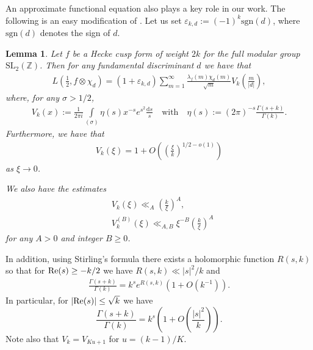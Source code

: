 \documentclass[a4paper,10pt,twoside]{amsart}
\newtheorem{lemma}[theorem]{Lemma}
\theoremstyle{definition}
\numberwithin{equation}{section}
\newcommand\eps{\varepsilon}
\renewcommand{\Re}{\textnormal{Re}}
\renewcommand\:{\colon}
\begin{document}
An approximate functional equation also plays a key role in our work. The following is an easy modification of \cite[Lemma 5]{Radziwill-Soundararajan2015}. Let us set $\varepsilon_{k,d}:=(-1)^k\text{sgn}(d)$, where $\text{sgn}(d)$ denotes the sign of $d$.
\begin{lemma}\label{lem:AFE}
Let $f$ be a Hecke cusp form of weight $2k$ for the full modular group $\mathrm{SL}_2(\mathbb Z)$. Then for any fundamental discriminant $d$ we have that
\begin{align*}
L\left(\frac12,f\otimes\chi_d\right)=(1+\varepsilon_{k,d})\sum_{m=1}^\infty\frac{\lambda_f(m)\chi_d(m)}{\sqrt m}V_k\left(\frac m{|d|}\right),
\end{align*}
where, for any $\sigma>1/2$,
\begin{align}\label{integral-rep-for-weight}
V_k(x):=\frac1{2\pi i}\int\limits_{(\sigma)}\eta(s)x^{-s}e^{s^2}\frac{\mathrm d s}s\quad\text{with}\quad \eta(s):=(2\pi)^{-s}\frac{\Gamma(s+k)}{\Gamma(k)}.
\end{align}
Furthermore, we have that
\begin{align}\label{weight-function-asymptotics}
V_k(\xi)=1+O\left(\left(\frac\xi k\right)^{1/2-o(1)}\right)
\end{align}
as $\xi\longrightarrow 0$.

We also have the estimates
\begin{align}\label{der-bounds}
& V_k(\xi)\ll_A \left(\frac k\xi\right)^A,\nonumber \\
&V_k^{(B)}(\xi)\ll_{A,B}\xi^{-B}\left(\frac k\xi\right)^A
\end{align}
for any $A>0$ and integer $B\geq 0$.
\end{lemma}
\noindent In addition, using Stirling's formula there exists a holomorphic function $R(s,k)$ so that for $\Re(s)\geq -k/2$ we have $R(s,k)\ll |s|^2/k$ and
\begin{align}\label{Stirling}
\frac{\Gamma(s+k)}{\Gamma(k)}=k^s e^{R(s,k)}\left(1+O\left(k^{-1}\right)\right).
\end{align}
In particular, for $|\Re(s)|\leq\sqrt k$ we have
\[ 
\frac{\Gamma(s+k)}{\Gamma(k)}=k^s\left(1+O\left(\frac{|s|^2}k\right)\right).
\]
Note also that $V_k=V_{Ku+1}$ for $u=(k-1)/K$. 
\end{document}

